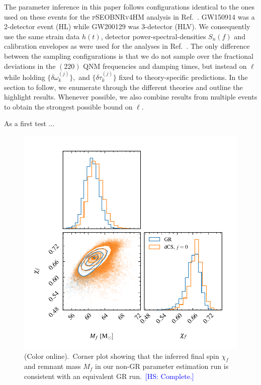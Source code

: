 \documentclass[twocolumn,
               prd,
               aps,
               superscriptaddress,
               tightenlines,
               nofootinbib,
               eqsecnum,
               amsfonts,
               amsmath,
               longbibliography]{revtex4-1}
\newcommand{\hs}[1]{{\textcolor{blue}{{[HS: #1]}} }}
\begin{document}
The parameter inference in this paper follows configurations identical to the
ones used on these events for the \textsc{pSEOBNRv4HM} analysis in
Ref.~\cite{LIGOScientific:2021sio}. GW150914 was a 2-detector event (HL) while
GW200129 was 3-detector (HLV).
%
We consequently use the same strain data $h(t)$, detector
power-spectral-densities $S_n(f)$ and calibration envelopes as were used for
the analyses in Ref.~\cite{LIGOScientific:2021sio}.
%
The only difference between the sampling configurations is that we do not
sample over the fractional deviations in the $(220)$ QNM frequencies and
damping times, but instead on $\ell$ while holding $\{\delta \omega_k^{(j)}\},$
and $\{\delta \tau_k^{(j)}\}$ fixed to theory-specific predictions.
%
In the section to follow, we enumerate through the different theories and
outline the highlight results. Whenever possible, we also combine results from
multiple events to obtain the strongest possible bound on $\ell$.


As a first test ...

\begin{figure}[t]
\includegraphics[width=\columnwidth]{figs/tmp_corner_plot.pdf}
\caption{(Color online).~Corner plot showing that the inferred final spin $\chi_f$ and remnant mass $M_f$
in our non-GR parameter estimation run is consistent with an equivalent GR run.~\hs{Complete.}}
\label{fig:corner_plot}
\end{figure}
\end{document}
